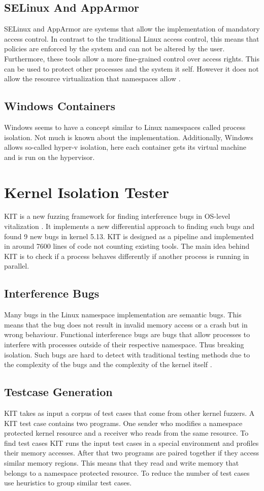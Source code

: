 \documentclass[10pt,twocolumn,a4paper]{article}
\begin{document}
\subsection{SELinux And AppArmor}
SELinux and AppArmor are systems that allow the implementation of mandatory access control. In
contrast to the traditional Linux access control, this means that policies are enforced by the system
and can not be altered by the user. Furthermore, these tools allow a more fine-grained control over
access rights. This can be used  to protect other processes and the system it self. However it does not allow the resource
virtualization that namespaces allow \cite{26,27}. 
\subsection{Windows Containers}
Windows seems to have a concept similar to Linux namespaces called process isolation. Not much is known about the
implementation. Additionally, Windows allows so-called hyper-v isolation, here each container
gets its virtual machine and is run on the hypervisor\cite{3}.

\section{Kernel Isolation Tester}
KIT is a new fuzzing framework for finding interference bugs in OS-level vitalization \cite{0}. 
It implements a new differential approach to finding such bugs and found 9 new bugs in kernel 5.13\cite{2}.
KIT is designed as a pipeline and implemented in around 7600 lines of code not counting existing tools\cite{0}.
The main idea behind KIT is to check if a process behaves differently if another process is running
in parallel.

\subsection{Interference Bugs}
Many bugs in the Linux namespace implementation are semantic bugs.
This means that the bug does not result in invalid memory access or a crash but in wrong behaviour. 
Functional interference bugs are bugs that allow processes to interfere with processes outside of their respective namespace.
Thus breaking isolation. Such bugs are hard to detect with traditional testing methods due to the
complexity of the bugs and the complexity of the kernel itself \cite{0}. 

\subsection{Testcase Generation}
KIT takes as input a corpus of test cases that come from other kernel fuzzers.
A KIT test case contains two programs. One sender who modifies a namespace protected kernel
resource and a receiver who reads from the same resource. To find test cases KIT runs the input test cases in a special environment and profiles their memory accesses. 
After that two programs are paired together if they access similar memory regions. 
This means that they read and write memory that belongs to a namespace protected resource.
To reduce the number of test cases use heuristics to group similar test cases.
\end{document}
